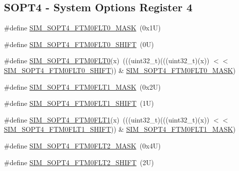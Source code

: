 \subsection*{S\+O\+P\+T4 -\/ System Options Register 4}
\begin{DoxyCompactItemize}
\item 
\#define \mbox{\hyperlink{group___s_i_m___register___masks_gaa868cd9e56dc4f0280f6d1866da1ac57}{S\+I\+M\+\_\+\+S\+O\+P\+T4\+\_\+\+F\+T\+M0\+F\+L\+T0\+\_\+\+M\+A\+SK}}~(0x1\+U)
\item 
\#define \mbox{\hyperlink{group___s_i_m___register___masks_gafc9e6a78afb92b0ff8189d6bc30c39ce}{S\+I\+M\+\_\+\+S\+O\+P\+T4\+\_\+\+F\+T\+M0\+F\+L\+T0\+\_\+\+S\+H\+I\+FT}}~(0\+U)
\item 
\#define \mbox{\hyperlink{group___s_i_m___register___masks_ga349b7a0ef6c75237aaf524d4a2eea215}{S\+I\+M\+\_\+\+S\+O\+P\+T4\+\_\+\+F\+T\+M0\+F\+L\+T0}}(x)~(((uint32\+\_\+t)(((uint32\+\_\+t)(x)) $<$$<$ \mbox{\hyperlink{group___s_i_m___register___masks_gafc9e6a78afb92b0ff8189d6bc30c39ce}{S\+I\+M\+\_\+\+S\+O\+P\+T4\+\_\+\+F\+T\+M0\+F\+L\+T0\+\_\+\+S\+H\+I\+FT}})) \& \mbox{\hyperlink{group___s_i_m___register___masks_gaa868cd9e56dc4f0280f6d1866da1ac57}{S\+I\+M\+\_\+\+S\+O\+P\+T4\+\_\+\+F\+T\+M0\+F\+L\+T0\+\_\+\+M\+A\+SK}})
\item 
\#define \mbox{\hyperlink{group___s_i_m___register___masks_gaa42586e5889050292d5e70bf2d1aea2d}{S\+I\+M\+\_\+\+S\+O\+P\+T4\+\_\+\+F\+T\+M0\+F\+L\+T1\+\_\+\+M\+A\+SK}}~(0x2\+U)
\item 
\#define \mbox{\hyperlink{group___s_i_m___register___masks_gaf503fb0314431593f41ebe5fa4b83851}{S\+I\+M\+\_\+\+S\+O\+P\+T4\+\_\+\+F\+T\+M0\+F\+L\+T1\+\_\+\+S\+H\+I\+FT}}~(1\+U)
\item 
\#define \mbox{\hyperlink{group___s_i_m___register___masks_gae3b559637db920847b18d6cebce303d3}{S\+I\+M\+\_\+\+S\+O\+P\+T4\+\_\+\+F\+T\+M0\+F\+L\+T1}}(x)~(((uint32\+\_\+t)(((uint32\+\_\+t)(x)) $<$$<$ \mbox{\hyperlink{group___s_i_m___register___masks_gaf503fb0314431593f41ebe5fa4b83851}{S\+I\+M\+\_\+\+S\+O\+P\+T4\+\_\+\+F\+T\+M0\+F\+L\+T1\+\_\+\+S\+H\+I\+FT}})) \& \mbox{\hyperlink{group___s_i_m___register___masks_gaa42586e5889050292d5e70bf2d1aea2d}{S\+I\+M\+\_\+\+S\+O\+P\+T4\+\_\+\+F\+T\+M0\+F\+L\+T1\+\_\+\+M\+A\+SK}})
\item 
\#define \mbox{\hyperlink{group___s_i_m___register___masks_gafa0c4deac7488857fd22e28602b612fb}{S\+I\+M\+\_\+\+S\+O\+P\+T4\+\_\+\+F\+T\+M0\+F\+L\+T2\+\_\+\+M\+A\+SK}}~(0x4\+U)
\item 
\#define \mbox{\hyperlink{group___s_i_m___register___masks_gacca0c622cfa1e0c7e7214096c38c6557}{S\+I\+M\+\_\+\+S\+O\+P\+T4\+\_\+\+F\+T\+M0\+F\+L\+T2\+\_\+\+S\+H\+I\+FT}}~(2\+U)

\end{DoxyCompactItemize}
